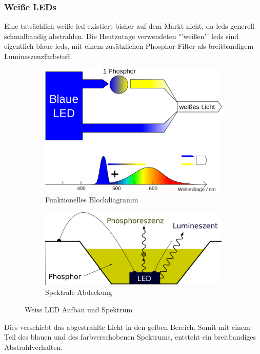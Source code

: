 \documentclass[11pt]{scrartcl}
\begin{document}
\subsubsection{Weiße LEDs}
Eine tatsächlich weiße \ac{led} existiert bisher auf dem Markt nicht, da \ac{led}s generell schmalbandig abstrahlen. Die Heutzutage
verwendeten "'weißen"' \ac{led}s sind eigentlich blaue \ac{led}s, mit einem zusätzlichen Phosphor Filter als breitbandigem Lumineszenzfarbstoff.
\begin{figure}[H]
    \centering
    \begin{subfigure}[b]{0.49\textwidth}
        \includegraphics[width=\textwidth]{images/LED_weiss_P_blau.png}
        \caption{Funktionelles Blockdiagramm}
    \end{subfigure}
    \hfill 
    \begin{subfigure}[b]{0.49\textwidth}
        \includegraphics[width=\textwidth]{images/LED_weiss_phosphor.png}
        \caption{Spektrale Abdeckung}
    \end{subfigure}
    \caption{Weiss LED Aufbau und Spektrum \cite{wikiLed}}\label{fig:White LED}
\end{figure}
\noindent
Dies verschiebt das abgestrahlte Licht in den gelben Bereich. Somit mit einem Teil des blauen und des farbverschobenen Spektrums, entsteht
ein breitbandiges Abstrahlverhalten.
\clearpage
\end{document}
